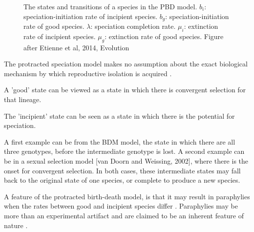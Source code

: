 \begin{figure}
  \centering

  \caption{
    The states and transitions of a species in the PBD model.
    $b_i$: speciation-initiation rate of incipient species. 
    $b_g$: speciation-initiation rate of good species. 
    $\lambda$: speciation completion rate. 
    $\mu_i$: extinction rate of incipient species. 
    $\mu_g$: extinction rate of good species. 
    Figure after Etienne et al, 2014, Evolution
  }
  \label{fig:pbd_states}
\end{figure}


The protracted speciation model makes no assumption about the exact biological
mechanism by which reproductive isolation is 
acquired \cite{etienne2012prolonging, etienne2014estimating,rosindell2010protracted}.

A 'good' state can be viewed as a state in which there is convergent selection
for that lineage.

The 'incipient' state can be seen as a state in which there is the potential
for speciation.

A first example can be from the BDM  model, the state in which there
are all three genotypes, before the intermediate genotype is lost.
A second example can be in a sexual selection model [van Doorn and Weissing, 2002], 
where there is the onset for convergent selection.
In both cases, these intermediate states may fall back to the original
state of one species, or complete to produce a new species.


A feature of the protracted birth-death model, is that it may result in
paraphylies when the rates between good and incipient species differ .
Paraphylies may be more than an experimental artifact and are claimed to
be an inherent feature of nature \cite{funk2003species}.

